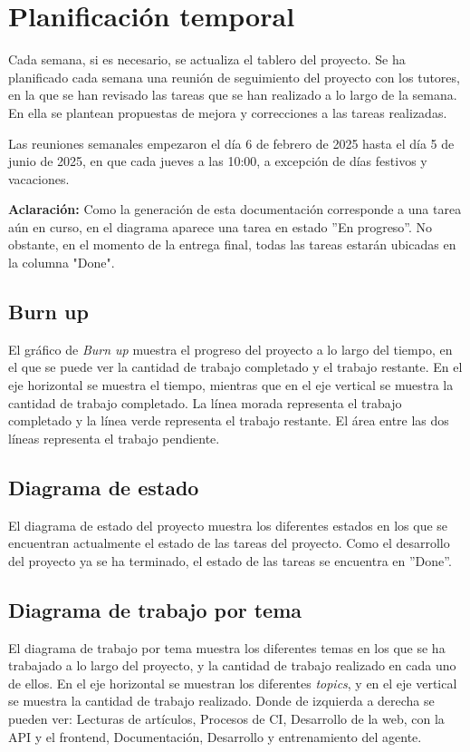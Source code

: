 \section{Planificación temporal}
Cada semana, si es necesario, se actualiza el tablero del proyecto.
Se ha planificado cada semana una reunión de seguimiento del proyecto con los tutores, en la que se han revisado las tareas que se han realizado a lo largo de la semana. En ella se plantean propuestas de mejora y correcciones a las tareas realizadas.

Las reuniones semanales empezaron el día 6 de febrero de 2025 hasta el día 5 de junio de 2025, en que cada jueves a las 10:00, a excepción de días festivos y vacaciones.

\textbf{Aclaración:} Como la generación de esta documentación corresponde a una tarea aún en curso, en el diagrama aparece una tarea en estado ''En progreso''. No obstante, en el momento de la entrega final, todas las tareas estarán ubicadas en la columna "Done".

\subsection{Burn up}
El gráfico de \textit{Burn up} muestra el progreso del proyecto a lo largo del tiempo, en el que se puede ver la cantidad de trabajo completado y el trabajo restante. En el eje horizontal se muestra el tiempo, mientras que en el eje vertical se muestra la cantidad de trabajo completado. La línea morada representa el trabajo completado y la línea verde representa el trabajo restante. El área entre las dos líneas representa el trabajo pendiente.


\subsection{Diagrama de estado}
El diagrama de estado del proyecto muestra los diferentes estados en los que se encuentran actualmente el estado de las tareas del proyecto. Como el desarrollo del proyecto ya se ha terminado, el estado de las tareas se encuentra en ''Done''. 



\subsection{Diagrama de trabajo por tema}
El diagrama de trabajo por tema muestra los diferentes temas en los que se ha trabajado a lo largo del proyecto, y la cantidad de trabajo realizado en cada uno de ellos. En el eje horizontal se muestran los diferentes \textit{topics}, y en el eje vertical se muestra la cantidad de trabajo realizado.
Donde de izquierda a derecha se pueden ver: Lecturas de artículos,  Procesos de CI, Desarrollo de la web, con la API y el frontend, Documentación, Desarrollo y entrenamiento del agente.

